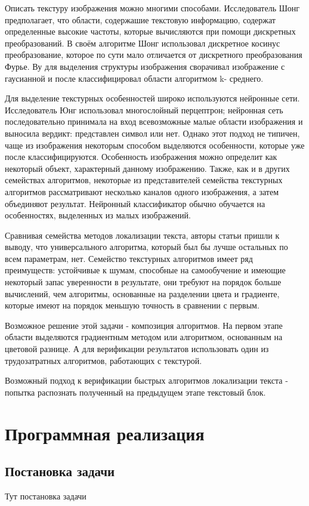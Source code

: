 \documentclass[oneside,final,14pt]{extreport}
\begin{document}
Описать текстуру изображения можно многими способами. Исследователь Шонг   предполагает, что области, содержашие текстовую информацию, содержат определенные высокие частоты, которые вычисляются при помощи дискретных преобразований. В своём алгоритме Шонг использовал дискретное косинус преобразование, которое по сути мало отличается от дискретного преобразования Фурье.  Ву для выделения структуры изображения сворачивал изображение с гаусианной и после классифицировал области алгоритмом k- среднего.

Для выделение текстурных особенностей широко используются нейронные сети. Исследователь Юнг  использовал многослойный перцептрон; нейронная сеть последовательно принимала на вход всевозможные малые области изображения и выносила вердикт: представлен символ или нет. Однако этот подход не типичен, чаще из изображения некоторым способом выделяются особенности, которые уже после классифицируются. Особенность изображения можно определит как некоторый объект, характерный данному изображению. Также, как и в других семействах алгоритмов, некоторые из представителей семейства текстурных алгоритмов рассматривают несколько каналов одного изображения, а затем объединяют результат. Нейронный классификатор обычно обучается на особенностях, выделенных из малых изображений.  

Сравнивая семейства методов локализации текста, авторы статьи \cite{JDAR_survey} пришли к выводу, что универсального алгоритма, который был бы лучше остальных по всем параметрам, нет.  Семейство текстурных алгоритмов имеет ряд преимуществ: устойчивые к шумам, способные на самообучение и имеющие некоторый запас уверенности в результате, они требуют на порядок больше вычислений, чем алгоритмы, основанные на разделении цвета и градиенте, которые имеют на порядок меньшую точность в сравнении с первым. 

Возможное решение этой задачи - композиция алгоритмов. На первом этапе области выделяются градиентным методом или алгоритмом, основанным на цветовой разнице. А для верификации результатов использовать один из трудозатратных алгоритмов, работающих с текстурой.   

Возможный подход к верификации быстрых алгоритмов локализации текста - попытка распознать полученный на предыдущем этапе текстовый блок.

\chapter{Программная реализация}
\section{Постановка задачи}
Тут постановка задачи
\end{document}
